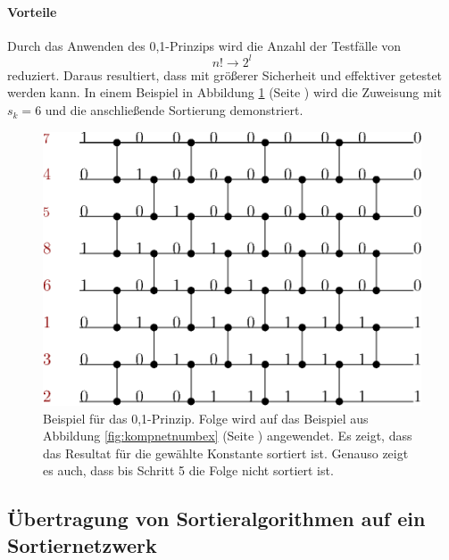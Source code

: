 \documentclass[11pt,ngerman]{article}
\begin{document}
\paragraph{Vorteile} Durch das Anwenden des 0,1-Prinzips wird die Anzahl der Testfälle von 
\begin{equation}
n! \rightarrow 2^l
\label{eq:fallred}
\end{equation} 
reduziert. Daraus resultiert, dass mit größerer Sicherheit und effektiver getestet werden kann.
In einem Beispiel in Abbildung \ref{fig:01ex} (Seite \pageref{fig:01ex}) wird die Zuweisung mit $s_k = 6$ und die anschließende Sortierung demonstriert. 
\begin{figure}
\begin{center}
\includegraphics[scale=0.75]{01beispiel.eps}
\end{center}
\caption{Beispiel für das 0,1-Prinzip. Folge wird auf das Beispiel aus Abbildung \ref{fig:kompnetnumbex} (Seite \pageref{fig:kompnetnumbex}) angewendet. Es zeigt, dass das Resultat für die gewählte Konstante sortiert ist. Genauso zeigt es auch, dass bis Schritt 5 die Folge nicht sortiert ist.}
\label{fig:01ex}
\end{figure}
\subsection{Übertragung von Sortieralgorithmen auf ein Sortiernetzwerk}
\end{document}
